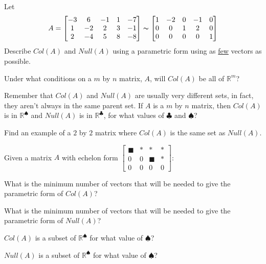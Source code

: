 \bq Let $$A=\begin{bmatrix} -3&6&-1&1&-7 \\1&-2&2&3&-1 \\2&-4&5&8&-8 \end{bmatrix} \thicksim \begin{bmatrix} 1&-2&0&-1&0\\0&0&1&2&0 \\ 0&0&0&0&1 \end{bmatrix}$$
Describe $Col(A)$ and $Null(A)$ using a parametric form using as \underline{few} vectors as possible.
\eq

\bq Under what conditions on a $m$ by $n$ matrix, $A$, will $Col(A)$ be all of $\mathbb{R}^m$?
\eq

Remember that $Col(A)$ and $Null(A)$ are usually very different sets, in fact, they aren't always in the same parent set. If $A$ is a $m$ by $n$ matrix, then $Col(A)$ is in $\mathbb{R}^{\spadesuit}$ and $Null(A)$ is in $\mathbb{R}^{\clubsuit}$, for what values of $\clubsuit$ and $\spadesuit$?

\bq Find an example of a $2$ by $2$ matrix where $Col(A)$ is the same set as $Null(A)$.
\eq

\bq Given a matrix $A$ with echelon form $\begin{bmatrix} \blacksquare&*&*&*\\0&0&\blacksquare&* \\ 0&0&0&0 \end{bmatrix}$:
\be
\item What is the minimum number of vectors that will be needed to give the parametric form of $Col(A)$?
\item What is the minimum number of vectors that will be needed to give the parametric form of $Null(A)$?
\item $Col(A)$ is a subset of $\mathbb{R}^\spadesuit$ for what value of $\spadesuit$?
\item $Null(A)$ is a subset of $\mathbb{R}^\spadesuit$ for what value of $\spadesuit$?
\ee
\eq

